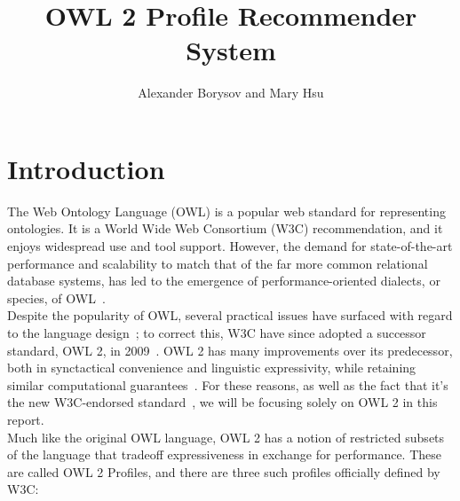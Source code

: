 \documentclass[a4paper,titlepage,11pt]{scrartcl}
\begin{document}
\title{OWL 2 Profile Recommender System}
\author{Alexander Borysov and Mary Hsu}
\maketitle
{}

\section{Introduction}
The Web Ontology Language (OWL) is a popular web standard for representing ontologies. It is a World Wide Web Consortium (W3C) recommendation, and it enjoys widespread use and tool support. However, the demand for state-of-the-art performance and scalability to match that of the far more common relational database systems, has led to the emergence of performance-oriented dialects, or species, of OWL~\cite{w3owl1guide}.\\

Despite the popularity of OWL, several practical issues have surfaced with regard to the language design~\cite{nextowlstep}; to correct this, W3C have since adopted a successor standard, OWL 2, in 2009~\cite{w3owl2overview}. OWL 2 has many improvements over its predecessor, both in synctactical convenience and linguistic expressivity, while retaining similar computational guarantees~\cite{w3owl2new}. For these reasons, as well as the fact that it's the new W3C-endorsed standard~\cite{w3owl2overview}, we will be focusing solely on OWL 2 in this report.\\

Much like the original OWL language, OWL 2 has a notion of restricted subsets of the language that tradeoff expressiveness in exchange for performance. These are called OWL 2 Profiles, and there are three such profiles officially defined by W3C:\\
\end{document}

